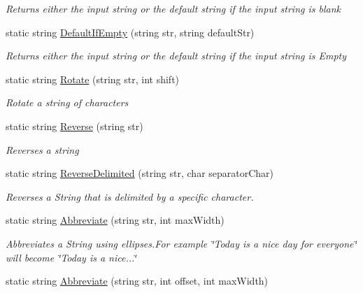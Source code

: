 \begin{DoxyCompactItemize}
\begin{DoxyCompactList}\small\item\em Returns either the input string or the default string if the input string is blank \end{DoxyCompactList}\item 
static string \hyperlink{class_ultimate_1_1_utilities_1_1_string_utils_a15a094c3bf2e3b3d89f7f103a7e7cb69}{Default\+If\+Empty} (string str, string default\+Str)
\begin{DoxyCompactList}\small\item\em Returns either the input string or the default string if the input string is Empty \end{DoxyCompactList}\item 
static string \hyperlink{class_ultimate_1_1_utilities_1_1_string_utils_ada66d9c69f0b183aecee9c6c3bd8e889}{Rotate} (string str, int shift)
\begin{DoxyCompactList}\small\item\em Rotate a string of characters \end{DoxyCompactList}\item 
static string \hyperlink{class_ultimate_1_1_utilities_1_1_string_utils_acf312eeb6bd041231b23f0afd4158431}{Reverse} (string str)
\begin{DoxyCompactList}\small\item\em Reverses a string \end{DoxyCompactList}\item 
static string \hyperlink{class_ultimate_1_1_utilities_1_1_string_utils_ae3e1e7cc72506892b269a4cfb3b49252}{Reverse\+Delimited} (string str, char separator\+Char)
\begin{DoxyCompactList}\small\item\em Reverses a String that is delimited by a specific character. \end{DoxyCompactList}\item 
static string \hyperlink{class_ultimate_1_1_utilities_1_1_string_utils_a58896f92d8c168e9d889a063f54b57d3}{Abbreviate} (string str, int max\+Width)
\begin{DoxyCompactList}\small\item\em Abbreviates a String using ellipses.\+For example \char`\"{}\+Today is a nice day for everyone\char`\"{} will become \char`\"{}\+Today is a nice...\char`\"{} \end{DoxyCompactList}\item 
static string \hyperlink{class_ultimate_1_1_utilities_1_1_string_utils_a2acd2ee11d7855487ef9cf585c372504}{Abbreviate} (string str, int offset, int max\+Width)

\end{DoxyCompactItemize}
